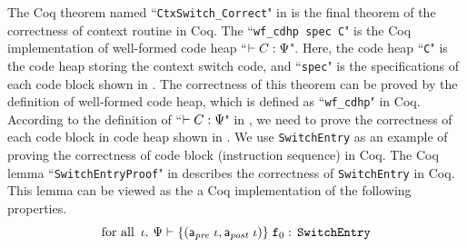 The Coq theorem named ``{\tt CtxSwitch\_Correct}" in 
\Fig{\ref{fig:Coq code Example}} is the final theorem of 
the correctness of context routine in Coq.
The ``{\tt wf\_cdhp spec C}" is the  
Coq implementation of well-formed code heap 
``$\vdash {C} : {\Psi}$". Here, the code heap 
``{\tt C}" is the code heap storing the context 
switch code, and ``{\tt spec}" is the specifications 
of each code block shown in 
\Fig{\ref{fig:The Structure of Context Switch Module}}. 
The correctness of this theorem can be proved by the 
definition of well-formed code heap, which is defined 
as ``{\tt wf\_cdhp}" in Coq. According to the 
definition of ``$\vdash {C} : {\Psi}$" in 
\Fig{\ref{fig:Seleted Inference rules}}, we need to 
prove the correctness of each code block in code heap shown in 
\Fig{\ref{fig:The Structure of Context Switch Module}}. 
We use \texttt{SwitchEntry} as an example 
of proving the correctness of code block 
(instruction sequence) in Coq. 
The Coq lemma ``\texttt{SwitchEntryProof}" in 
\Fig{\ref{fig:Coq code Example}}
describes the correctness of \texttt{SwitchEntry} 
in Coq. This lemma can be viewed as the a Coq implementation 
of the following properties. 
\[
    \text{for all } \, \lgvl. \ 
    \wfcblk{\apre \ \lgvl}{\apost \ \lgvl}{\lab{0}}
        {\texttt{SwitchEntry}}
\]
